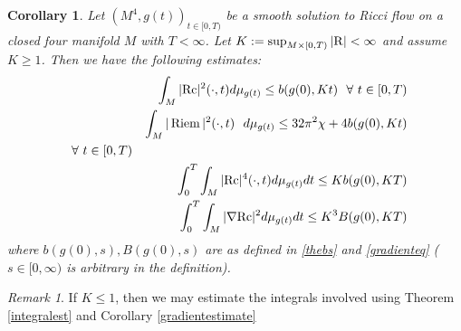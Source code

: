 \documentclass{amsart}
\numberwithin{equation}{section}
\newtheorem{coro}[theo]{Corollary}
\theoremstyle{definition}
\theoremstyle{remark}
\newtheorem{remark}[theo]{Remark}
\begin{document}
\begin{coro}
Let $(M^4,g(t))_{t \in [0,T)}$ be a  smooth solution to Ricci
flow on a closed four manifold $M$ with
$T< \infty$.
Let $K:= \sup_{M \times [0,T)} |{{\rm R}}| < \infty$ and assume $K \geq 1$.
Then we have the following estimates:
\begin{eqnarray} 
&& \int_M  |{{\rm{Rc}}}|^2 (\cdot,t)d\mu_{g(t)} \leq  b(g(0),Kt)  \ \ \forall
\ t \in [0,T) \label{no1g} \\
&& \int_M |\operatorname{Riem}|^2( \cdot,t) \ \ d\mu_{g(t)} \leq 32 \pi^2 \chi  +
4b(g(0),Kt) \cr 
\ \ \forall
\ t \in [0,T)  \label{no2g} \\
&& \int_{0}^T \int_M |{{\rm{Rc}}}|^4(\cdot,t) d\mu_{g(t)} dt\leq Kb(g(0),KT)  \label{no3g}\\
&&\int_{0}^T \int_M |{\nabla} {{\rm{Rc}}}|^2 d \mu_{g(t)} dt \leq   K^3B(g(0),KT) \label{gradientg}
\end{eqnarray}
where  $b(g(0),s), B(g(0),s)$ are as defined in
\eqref{thebs} and \eqref{gradienteq}
($s \in [0,\infty)$ is arbitrary in the definition).

\end{coro}
\begin{remark} If $K \leq 1$, then we may estimate the integrals
  involved using Theorem \ref{integralest}
and Corollary \ref{gradientestimate}
\end{remark}
\end{document}
